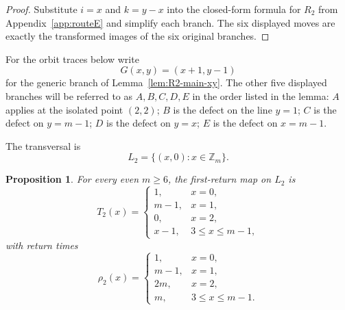 \documentclass[11pt]{article}
\newtheorem{proposition}{Proposition}
\newcommand{\Zm}{\mathbb Z_m}
\begin{document}
\begin{proof}
Substitute $i=x$ and $k=y-x$ into the closed-form formula for $R_2$ from Appendix~\ref{app:routeE} and simplify each branch.
The six displayed moves are exactly the transformed images of the six original branches.
\end{proof}

For the orbit traces below write
\[
G(x,y)=(x+1,y-1)
\]
for the generic branch of Lemma~\ref{lem:R2-main-xy}.
The other five displayed branches will be referred to as $A,B,C,D,E$ in the order listed in the lemma:
$A$ applies at the isolated point $(2,2)$;
$B$ is the defect on the line $y=1$;
$C$ is the defect on $y=m-1$;
$D$ is the defect on $y=x$;
$E$ is the defect on $x=m-1$.

The transversal is
\[
L_2=\{(x,0):x\in \Zm\}.
\]

\begin{proposition}\label{prop:R2-main-data}
For every even $m\ge 6$, the first-return map on $L_2$ is
\[
T_2(x)=
\begin{cases}
1,&x=0,\\
m-1,&x=1,\\
0,&x=2,\\
x-1,&3\le x\le m-1,
\end{cases}
\]
with return times
\[
\rho_2(x)=
\begin{cases}
1,&x=0,\\
m-1,&x=1,\\
2m,&x=2,\\
m,&3\le x\le m-1.
\end{cases}
\]
\end{proposition}
\end{document}
